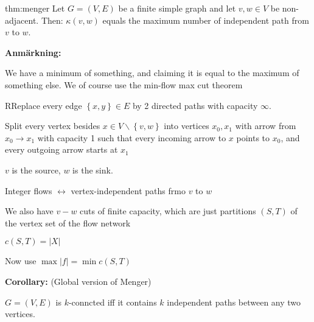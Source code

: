 \par\bigskip
\begin{theo}[Menger]{thm:menger}
  Let $G = (V,E)$ be a finite simple graph and let $v,w\in V$ be non-adjacent. Then: $\kappa(v,w)$ equals the maximum number of independent path from $v$ to $w$.
\end{theo}
\par\bigskip
\noindent\textbf{Anmärkning:}\par
\noindent We have a minimum of something, and claiming it is equal to the maximum of something else. We of course use the min-flow max cut theorem
\par\bigskip
\begin{prf}
  RReplace every edge $\left\{x,y\right\}\in E$ by 2 directed paths with capacity $\infty$.\par
\noindent Split every vertex besides $x\in V\backslash\left\{v,w\right\}$ into vertices $x_0,x_1$ with arrow from $x_0\to x_1$ with capacity 1 such that every incoming arrow to $x$ points to $x_0$, and every outgoing arrow starts at $x_1$
\par\bigskip
\noindent $v$ is the source, $w$ is the sink.
\par\bigskip
\noindent Integer flows $\leftrightarrow$ vertex-independent paths frmo $v$ to $w$
\par\bigskip
\noindent We also have $v-w$ cuts of finite capacity, which are just partitions $(S,T)$  of the vertex set of the flow network
\par\bigskip
\noindent $c(S,T) = \left|X\right|$
\par\bigskip
\noindent Now use $\max\left|f\right| = \min c(S,T)$
\end{prf}
\par\bigskip
\noindent\textbf{Corollary:} (Global version of Menger)\par
\noindent $G = (V,E)$ is $k$-conncted iff it contains $k$ independent paths between any two vertices.
\newpage
